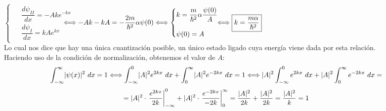 \documentclass{report}
\begin{document}
            $\begin{cases}
              \begin{aligned}
                &\dfrac{d\psi_{II}}{dx}=-Ake^{-kx}\\[10pt]
                &\dfrac{d\psi_{I}}{dx}=kAe^{kx}
              \end{aligned}
            \end{cases}$
            $\hspace{-0.8cm}\Longleftrightarrow-Ak-kA=-\dfrac{2m}{\hbar^2}\alpha\psi(0)\Longleftrightarrow
            \begin{cases}
              \begin{aligned}
                &k=\dfrac{m}{\hbar^2}\alpha\dfrac{\psi(0)}{A}\\[10pt]
                &\psi(0)=A
              \end{aligned}
            \end{cases}\hspace{-0.5cm}\Longleftrightarrow \boxed{k=\dfrac{m\alpha}{\hbar^2}}$\\

            \noindent Lo cual nos dice que hay una única cuantización posible, un único estado ligado cuya
            energía viene dada por esta relación.\\
            
            \noindent Haciendo uso de la condición de normalización, obtenemos el valor de $A$:
            \[\int_{-\infty}^{\infty}\abs{\psi(x)}^2\ dx=1\Longleftrightarrow\int_{-\infty}^0
            \abs{A}^2e^{2kx}\ dx+\int_0^\infty \abs{A}^2e^{-2kx}\ dx=1\Longleftrightarrow
            \abs{A}^2\int_{-\infty}^0 e^{2kx}\ dx+\abs{A}^2\int_0^\infty e^{-2kx}\ dx=\]
            \[=\lvert A\rvert^2\cdot\left.\dfrac{e^{2kx}}{2k}\right|_{-\infty}^0+\lvert A\rvert^2\cdot
            \left.\dfrac{e^{-2kx}}{-2k}\right|_0^\infty=\dfrac{\lvert A\rvert^2}{2k}+\dfrac{\lvert A\rvert^2}{2k}
            =\dfrac{\lvert A\rvert^2}{k}=1\]\\
\end{document}
